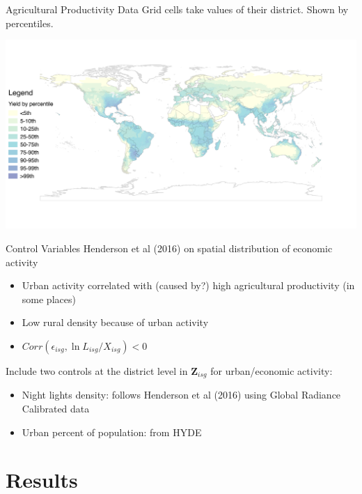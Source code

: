 \documentclass[10pt, xcolor=dvipsnames]{beamer}
\begin{document}
\begin{frame}{Agricultural Productivity Data}
Grid cells take values of their district. Shown by percentiles.
\vspace{-.5in}
\begin{center}
\includegraphics[scale=.5]{fig_csi_yield_map.png}
\end{center}
\end{frame}

\begin{frame}{Control Variables}
Henderson et al (2016) on spatial distribution of economic activity
\begin{itemize}
  \item Urban activity correlated with (caused by?) high agricultural productivity (in some places)
  \item Low rural density because of urban activity
  \item $Corr(\epsilon_{isg},\ln L_{isg}/X_{isg})<0$
\end{itemize}

Include two controls at the district level in $\mathbf{Z}_{isg}$ for urban/economic activity:
\begin{itemize}
  \item Night lights density: follows Henderson et al (2016) using Global Radiance Calibrated data
  \item Urban percent of population: from HYDE
\end{itemize}

\end{frame}

\section{Results}
\end{document}
